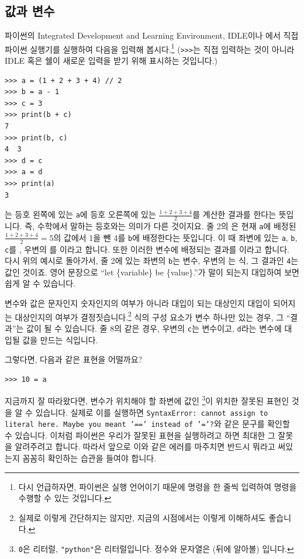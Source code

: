 \documentclass[../main.tex]{subfiles}
\begin{document}
\subsection{값과 변수}
파이썬의 Integrated Development and Learning Environment, IDLE이나 에서 직접 파이썬 실행기를 실행하여 다음을 입력해 봅시다.\footnote{다시 언급하자면, 파이썬은 실행 언어이기 때문에 명령을 한 줄씩 입력하여 명령을 수행할 수 있는 것입니다.}
(\verb/>>>/는 직접 입력하는 것이 아니라 IDLE 혹은 쉘이 새로운 입력을 받기 위해 표시하는 것입니다.)
\begin{verbatim}
>>> a = (1 + 2 + 3 + 4) // 2
>>> b = a - 1
>>> c = 3
>>> print(b + c)
7
>>> print(b, c)
4  3
>>> d = c
>>> a = d
>>> print(a)
3
\end{verbatim}
는 등호 왼쪽에 있는 \verb/a/에 등호 오른쪽에 있는 $\frac{1+2+3+4}{2}$를 계산한 결과를 한다는 뜻입니다.
즉, 수학에서 말하는 등호와는 의미가 다른 것이지요.
줄 2의 은 현재 \verb/a/에 배정된 $\frac{1+2+3+4}{2} = 5$의 값에서 1을 뺀 4를 \verb/b/에 배정한다는 뜻입니다.
이 때 좌변에 있는 \verb/a/, \verb/b/, \verb/c/를 , 우변의 를 이라고 합니다.
또한 이러한 변수에 배정되는 결과를 이라고 합니다.
다시 위의 예시로 돌아가서, 줄 2에 있는 좌변의 \verb/b/는 변수, 우변의 는 식, 그 결과인 \verb/4/는 값인 것이죠.
영어 문장으로 ``let \{variable\} be \{value\}.''가 말이 되는지 대입하여 보면 쉽게 알 수 있습니다.

변수와 값은 문자인지 숫자인지의 여부가 아니라 대입이 되는 대상인지 대입이 되어지는 대상인지의 여부가 결정짓습니다.\footnote{실제로 이렇게 간단하지는 않지만, 지금의 시점에서는 이렇게 이해하셔도 좋습니다.}
식의 구성 요소가 변수 하나만 있는 경우, 그 ``결과''는 값이 될 수 있습니다.
줄 8의 같은 경우, 우변의 \verb/c/는 변수이고, \verb/d/라는 변수에 대입될 값을 만드는 식입니다.

그렇다면, 다음과 같은 표현을 어떨까요?
\begin{verbatim}
>>> 10 = a
\end{verbatim}
지금까지 잘 따라왔다면, 변수가 위치해야 할 좌변에 값인 \footnote{\texttt{0}은  리터럴, \texttt{"python"}은  리터럴입니다. 정수와 문자열은 (뒤에 알아볼) 입니다.}이 위치한 잘못된 표현인 것을 알 수 있습니다.
실제로 이를 실행하면 \texttt{SyntaxError: cannot assign to literal here. Maybe you meant '==' instead of '='?}와 같은 문구를 확인할 수 있습니다.
이처럼 파이썬은 우리가 잘못된 표현을 실행하려고 하면 최대한 그 잘못을 알려주려고 합니다.
따라서 앞으로 이와 같은 에러를 마주치면 반드시 뭐라고 써있는지 꼼꼼히 확인하는 습관을 들여야 합니다.
\end{document}
